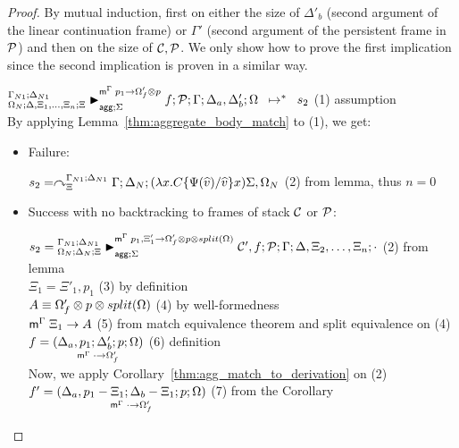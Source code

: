 \begin{proof}
By mutual induction, first on either the size of $\Delta'_b$ (second argument of
the linear continuation frame) or $\Gamma'$ (second argument of the
persistent frame in $\lstack{P}$) and then on the size of $\lstack{C},
\lstack{P}$.  We only show how to prove the first implication since the
second implication is proven in a similar way.

$\transs{\matstatea{\Delta, \Xi_1, \dotsc, \Xi_n}{f; \lstack{P}}{\Gamma}{\Delta_a,
      \Delta'_b}{\Omega}{p_1 \rightarrow \Omega'_f \otimes p}{\Sigma}}{s_2}$
         \hfill (1) assumption\\

By applying Lemma~\ref{thm:aggregate_body_match} to (1), we get:

\begin{itemize}[leftmargin=*]
   \item Failure:
   
   $s_2 = \derstatex{\Gamma}{\Delta_N}{\Xi}{\Gamma_{N1}}{\Delta_{N1}}
{(\lambda x.  C\{\Psi(\widehat{v})/\widehat{v}\} x) \Sigma,
   \Omega_N}$ \hfill (2) from lemma, thus $n = 0$\\
   
   \item Success with no backtracking to frames of stack $\lstack{C}$ or
   $\lstack{P}$:
   
      $s_2 = \matstatea{\Delta_N}{\lstack{C'}, f; \lstack{P}}{\Gamma}
         {\Delta, \Xi_2, \dotsc, \Xi_n}{\cdot}{p_1, \Xi'_1 \rightarrow \Omega'_f \otimes p
                                \otimes split(\Omega)}{\Sigma}$ \hfill (2) from
                                lemma \\
      $\Xi_1 = \Xi'_1, p_1$ \hfill (3) by definition \\

      $\feq{A}{\Omega'_f \otimes p \otimes split(\Omega)}$ \hfill (4) by
      well-formedness \\
      $\mz{\Gamma}{\Xi_1}{A}$ \hfill (5) from match equivalence
      theorem and split equivalence on (4) \\

      $f = \lframe{\Delta_a, p_1}{\Delta'_b}{p}{\Omega}{\cdot}{\Omega'_f}$
      \hfill (6) definition \\

      Now, we apply Corollary~\ref{thm:agg_match_to_derivation} on (2) \\

      $f' = \lframe{\Delta_a, p_1 - \Xi_1}{\Delta_b -
         \Xi_1}{p}{\Omega}{\cdot}{\Omega'_f}$ \hfill (7) from the Corollary \\



\end{itemize}
\end{proof}

